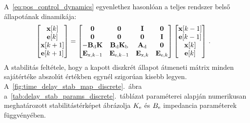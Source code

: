 A~\eqref{eq:pos_control_dynamics} egyenlethez hasonlóan a 
teljes rendszer belső állapotának dinamikája:
\begin{align}
    \begin{split}
        \begin{bmatrix}
        \mathbf{x}[k] \\
        \mathbf{e}[k] \\
        \mathbf{x}[k+1] \\ 
        \mathbf{e}[k+1] \\ 
        \end{bmatrix} &=
        \begin{bmatrix}
            \mathbf{0} & \mathbf{0} & \mathbf{I} & \mathbf{0} \\
            \mathbf{0} & \mathbf{0} & \mathbf{0} & \mathbf{I} \\
            -\mathbf{B}_{\mathrm{d}} \mathbf{K} & \mathbf{B}_{\mathrm{d}} \mathbf{K}_{\mathrm{b}} & \mathbf{A}_{\mathrm{d}} & \mathbf{0} \\
            \mathbf{E}_{\mathrm{x},k-1} & \mathbf{E}_{\mathrm{e},k-1} & \mathbf{E}_{\mathrm{x},k} & \mathbf{E}_{\mathrm{e},k} \\ 
        \end{bmatrix}
        \begin{bmatrix}
            \mathbf{x}[k-1] \\
            \mathbf{e}[k-1] \\
            \mathbf{x}[k] \\ 
            \mathbf{e}[k] \\ 
        \end{bmatrix}\,.
    \end{split}        
\end{align}
A stabilitás feltétele, hogy a kapott diszkrét állapot átmeneti mátrix minden sajátértéke abszolút 
értékben egynél szigorúan kisebb legyen. A~\ref{fig:time_delay_stab_map_discrete}.~ábra a~\ref{tab:delay_stab_params_discrete}.~táblázat paraméterei alapján numerikusan 
meghatározott stabilitástérképet ábrázolja \(K_{\mathrm{e}}\) és \(B_{\mathrm{e}}\) impedancia paraméterek függvényében. 

